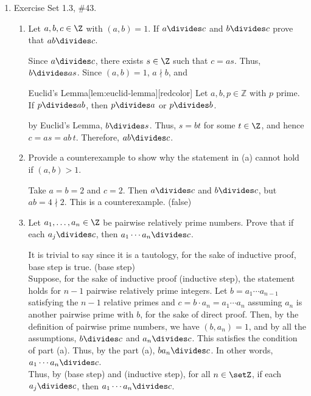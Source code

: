 \begin{enumerate}
  \item Exercise Set 1.3, \#43.
  \begin{enumerate}
    \item Let $a,b,c \in \Z$ with $(a,b)=1$. If $a \divides c$ and $b\divides c$ prove that $ab\divides c$.
    \begin{subprove}
      Since $a\divides c$, there exists $s\in\Z$ such that $c=a s$. Thus, $b\divides as$. Since $(a,b)=1$, $a \nmid b$, and
      \begin{define}{Euclid's Lemma}[lem:euclid-lemma][redcolor]
      Let $a,b,p\in\mathds{Z}$ with $p$ prime. If $p\divides ab$, then $p\divides a$ or $p\divides b$.
      \end{define}
      by Euclid's Lemma, $b\divides s$. Thus, $s=bt$ for some $t\in\Z$, and hence $c=as=ab\,t$. Therefore, $ab\divides c$.
    \end{subprove}
    \item Provide a counterexample to show why the statement in (a) cannot hold if $(a,b)>1$.
    \begin{subanswer}
      Take $a=b=2$ and $c=2$. Then $a\divides c$ and $b\divides c$, but $ab=4\nmid 2$. 
      This is a counterexample. (false)
    \end{subanswer}
    \item Let $a_1, \ldots, a_n \in \Z$ be pairwise relatively prime numbers. Prove that if each $a_j \divides c$, then $a_1 \cdots a_n \divides c$.
    \begin{subprove}
      It is trivial to say  since it is a 
      tautology, for the sake of inductive proof, base step is true. (base step)\vspace*{10px}\\
      Suppose, for the sake of inductive proof (inductive step), the statement holds for $n-1$ 
      pairwise relatively prime integers.
      Let $b=a_1\cdots a_{n-1}$ satisfying the $n-1$ relative primes and $c=b\cdot a_n = a_1\cdots a_{n}$ assuming $a_n$ is another 
      pairwise prime with $b$, for the sake of direct proof. 
      Then, by the definition of pairwise prime numbers, we have $(b,a_n)=1$, and by all the 
      assumptions, $b\divides c$ and $a_n\divides c$. This satisfies the condition of part (a). 
      Thus, by the part (a), $b a_n\divides c$. In other words, $a_1\cdots a_{n}\divides c$.\vspace*{10px}\\
      Thus, by (base step) and (inductive step), for all $n\in\setZ$, if each $a_j \divides c$, then $a_1 \cdots a_n \divides c$.
    \end{subprove}
  \end{enumerate}


\end{enumerate}
